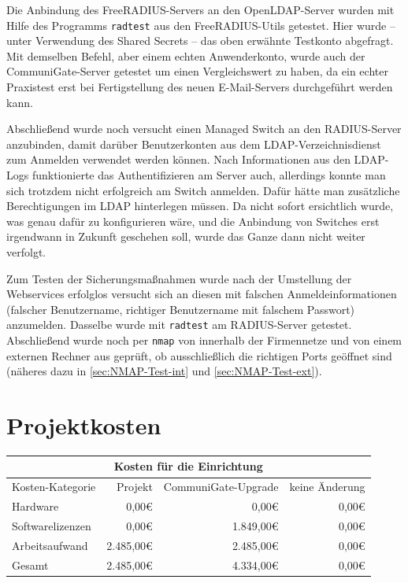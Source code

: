 \documentclass[11pt,a4paper,titlepage=firstiscover,headsepline,bibtotoc]{scrartcl} %
\newcommand{\hilight}[1]{\colorbox{yellow}{#1}} %
\newcommand{\mcc}[2]{\multicolumn{#1}{|c|}{#2}} %
\begin{document}
Die Anbindung des FreeRADIUS-Servers an den OpenLDAP-Server wurden mit Hilfe des Programms \texttt{radtest} aus den FreeRADIUS-Utils getestet. Hier wurde -- unter Verwendung des Shared Secrets -- das oben erwähnte Testkonto abgefragt. Mit demselben Befehl, aber einem echten Anwenderkonto, wurde auch der CommuniGate-Server getestet um einen Vergleichswert zu haben, da ein echter Praxistest erst bei Fertigstellung des neuen E-Mail-Servers durchgeführt werden kann.

Abschließend wurde noch versucht einen Managed Switch an den RADIUS-Server anzubinden, damit darüber Benutzerkonten aus dem LDAP-Verzeichnisdienst zum Anmelden verwendet werden können. Nach Informationen aus den LDAP-Logs funktionierte das Authentifizieren am Server auch, allerdings konnte man sich trotzdem nicht erfolgreich am Switch anmelden. Dafür hätte man zusätzliche Berechtigungen im LDAP hinterlegen müssen. Da nicht sofort ersichtlich wurde, was genau dafür zu konfigurieren wäre, und die Anbindung von Switches erst irgendwann in Zukunft geschehen soll, wurde das Ganze dann nicht weiter verfolgt.

\medskip \noindent
Zum Testen der Sicherungsmaßnahmen wurde nach der Umstellung der Webservices erfolglos versucht sich an diesen mit falschen Anmeldeinformationen (falscher Benutzername, richtiger Benutzername mit falschem Passwort) anzumelden. Dasselbe wurde mit \texttt{radtest} am RADIUS-Server getestet.
Abschließend wurde noch per \texttt{nmap} von innerhalb der Firmennetze und von einem externen Rechner aus geprüft, ob ausschließlich die richtigen Ports geöffnet sind (näheres dazu in \autoref{sec:NMAP-Test-int} und \autoref{sec:NMAP-Test-ext}).


\section{Projektkosten}\label{sec:Kosten}
\begin{tabularx}{\textwidth}{|X|r|r|r|}
\hline
\mcc{4}{Kosten für die Einrichtung}\\
\hline
Kosten-Kategorie	&	Projekt &	CommuniGate-Upgrade &	keine Änderung\\
\hline
Hardware &	0,00\euro{} &	0,00\euro{} &	0,00\euro{}\\
\hline
Softwarelizenzen &	0,00\euro{} &	1.849,00\euro{} &	0,00\euro{}\\
\hline
Arbeitsaufwand &	2.485,00\euro{} &	2.485,00\euro{} &	0,00\euro{}\\
\hhline{|=|=|=|=|}
Gesamt &	2.485,00\euro{} &	4.334,00\euro{} &	0,00\euro{}\\
\hline
\end{tabularx}
\end{document}
